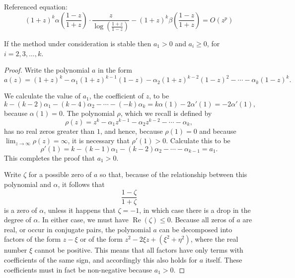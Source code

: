 \begin{theorem}
Referenced equation:
\begin{equation}
(1+z)^k \alpha\!\left(\frac{1-z}{1+z}\right) \cdot \frac{z}{\log\!\left(\frac{1+z}{1-z}\right)} - (1+z)^k \beta\!\left(\frac{1-z}{1+z}\right) = O(z^p) \tag{441a}
\end{equation}

\begin{lemma}

  \label{lem:441A}
If the method under consideration is stable then $a_1 > 0$ and
$a_i \ge 0$, for $i = 2, 3, \dots, k$.
\end{lemma}

\begin{proof}
Write the polynomial $a$ in the form
\[
a(z) = (1+z)^k - \alpha_1 (1+z)^{k-1}(1-z) - \alpha_2 (1+z)^{k-2}(1-z)^2 - \cdots - \alpha_k (1-z)^k.
\]

We calculate the value of $a_1$, the coefficient of $z$, to be
\[
k - (k-2)\alpha_1 - (k-4)\alpha_2 - \cdots - (-k)\alpha_k = k\alpha(1) - 2\alpha'(1) = -2\alpha'(1),
\]
because $\alpha(1) = 0$. The polynomial $\rho$, which we recall is defined by
\[
\rho(z) = z^k - \alpha_1 z^{k-1} - \alpha_2 z^{k-2} - \cdots - \alpha_k,
\]
has no real zeros greater than $1$, and hence, because $\rho(1) = 0$ and because
$\lim_{z\to\infty} \rho(z) = \infty$, it is necessary that $\rho'(1) > 0$. Calculate this to be
\[
\rho'(1) = k - (k-1)\alpha_1 - (k-2)\alpha_2 - \cdots - \alpha_{k-1} = a_1.
\]
This completes the proof that $a_1 > 0$.

Write $\zeta$ for a possible zero of $a$ so that, because of the relationship between
this polynomial and $\alpha$, it follows that
\[
\frac{1-\zeta}{1+\zeta}
\]
is a zero of $\alpha$, unless it happens that $\zeta = -1$, in which case there is a drop in
the degree of $\alpha$. In either case, we must have $\operatorname{Re}(\zeta) \le 0$. Because all zeros of
$a$ are real, or occur in conjugate pairs, the polynomial $a$ can be decomposed
into factors of the form $z - \xi$ or of the form $z^2 - 2\xi z + (\xi^2 + \eta^2)$, where the
real number $\xi$ cannot be positive. This means that all factors have only terms
with coefficients of the same sign, and accordingly this also holds for $a$ itself.
These coefficients must in fact be non-negative because $a_1 > 0$.
\end{proof}


\end{theorem}

